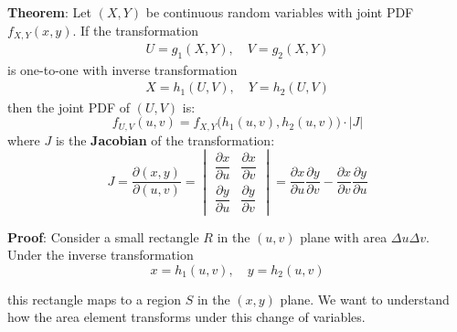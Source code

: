 \documentclass[twoside]{book}
\begin{document}
\begin{textbox}
\textbf{Theorem}: Let $(X,Y)$ be continuous random variables with joint PDF $f_{X,Y}(x,y)$. If the transformation
\begin{align*}
U = g_1(X,Y), \quad V = g_2(X,Y)
\end{align*}
is one-to-one with inverse transformation
\begin{align*}
X = h_1(U,V), \quad Y = h_2(U,V)
\end{align*}
then the joint PDF of $(U,V)$ is:
\[
f_{U,V}(u,v) = f_{X,Y}\big(h_1(u,v), h_2(u,v)\big) \cdot |J|
\]
where $J$ is the \textbf{Jacobian} of the transformation:
\[
J = \dfrac{\partial(x, y)}{\partial(u, v)} = \begin{vmatrix}
\dfrac{\partial x}{\partial u} & \dfrac{\partial x}{\partial v} \\[0.6em]
\dfrac{\partial y}{\partial u} & \dfrac{\partial y}{\partial v}
\end{vmatrix} = \dfrac{\partial x}{\partial u}\dfrac{\partial y}{\partial v} - \dfrac{\partial x}{\partial v}\dfrac{\partial y}{\partial u}
\]
\end{textbox}

\textbf{Proof}: Consider a small rectangle $R$ in the $(u, v)$ plane with area $\Delta u \Delta v$. Under the inverse transformation
\[
x = h_1(u, v), \quad y = h_2(u, v)
\]

this rectangle maps to a region $S$ in the $(x, y)$ plane. We want to understand how the area element transforms under this change of variables.
\end{document}
